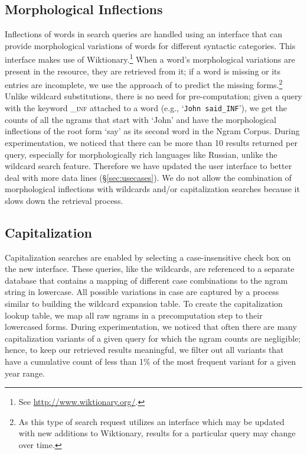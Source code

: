 \documentclass[11pt,a4paper]{article}
\newcommand{\query}[1]{\texttt{#1}}
\begin{document}
\subsection{Morphological Inflections}\label{sec:morph}
Inflections of words in search queries are handled using an interface that can provide morphological variations of words for different syntactic categories. This interface makes use of Wiktionary.\footnote{See \url{http://www.wiktionary.org/}.} When a word's
morphological variations are present in the resource, they are retrieved from it; if a word is missing or its entries are incomplete, we use the approach of  to predict the missing forms.\footnote{As this type of search request utilizes an interface which may be updated with new additions to Wiktionary, results for a particular query may change over time.} Unlike wildcard substitutions, there is no need for pre-computation; given a query with the keyword \textsf{\textsc{\_inf}} attached to a word (e.g., `\query{John said\_INF}'), we get the counts of all the ngrams that start with `John' and have the morphological inflections of the root form `say' as its second word in the Ngram Corpus. During experimentation, we noticed that there can be more than 10 results returned per query, especially for morphologically rich languages like Russian, unlike the wildcard search feature. Therefore we have updated the user interface to better deal with more data lines (\S\ref{sec:usecases}). We do not allow the combination of morphological inflections with wildcards and/or capitalization searches because it slows down the retrieval process.

\subsection{Capitalization}
Capitalization searches are enabled by selecting a case-insensitive check box on the new interface. These queries, like the wildcards, are referenced to a separate database that contains a mapping of different case combinations to the ngram string in lowercase. All possible variations in case are captured by a process similar to building the wildcard expansion table. To create the capitalization lookup table, we map all raw ngrams in a precomputation step to their lowercased forms. During experimentation, we noticed that often there are many capitalization variants of a given query for which the ngram counts are negligible; hence, to keep our retrieved results meaningful, we filter out all variants that have a cumulative count of less than 1\% of the most frequent variant for a given year range.
\end{document}
